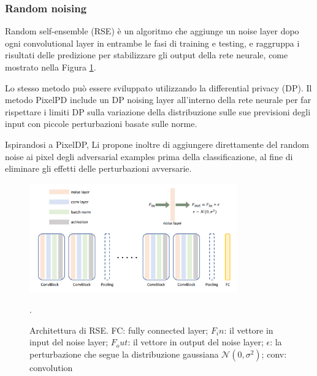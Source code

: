         \subsubsection{Random noising}
        Random self-ensemble (RSE) %
        \cite{liu2017towards} è un algoritmo che aggiunge un noise layer dopo ogni convolutional layer in entrambe le fasi di training e testing, e raggruppa i risultati delle predizione per stabilizzare gli output della rete neurale, come mostrato nella Figura \ref{Random noising}.
        
        Lo stesso metodo può essere sviluppato utilizzando la differential privacy (DP). Il metodo PixelPD 
        \cite{lecuyer2018certified} include un DP noising layer all'interno della rete neurale per far rispettare i limiti DP sulla variazione della distribuzione sulle sue previsioni degli input con piccole perturbazioni basate sulle norme.
        
        Ispirandosi a PixelDP, Li %
        \cite{li2018certified} propone inoltre di aggiungere direttamente del random noise ai pixel degli adversarial examples prima della classificazione, al fine di eliminare gli effetti delle perturbazioni avversarie.
            \begin{figure}[!h]
                \centering \includegraphics[width=0.8\textwidth]{Images/Mitigation/Random noising.png}
                \caption{Architettura di RSE. FC: fully connected layer; $F_in$: il vettore in input del noise layer; $F_out$: il vettore in output del noise layer; $\epsilon$: la perturbazione che segue la distribuzione gaussiana $\mathcal{N}(0, \sigma^2)$; conv: convolution}.
                \label{Random noising}
            \end{figure}
        
